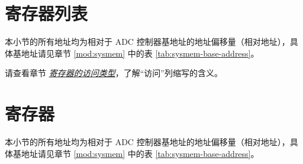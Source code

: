 \documentclass[main\_\_CN.tex]{subfiles}
\begin{document}
\section{寄存器列表}



本小节的所有地址均为相对于 ADC 控制器基地址的地址偏移量（相对地址），具体基地址请见章节 \ref{mod:sysmem} \textit{} 中的表 \ref{tab:sysmem-base-address}。

请查看章节 \hyperref[glossary-access-types]{\textit{寄存器的访问类型}}，了解“访问”列缩写的含义。



\section{寄存器}

本小节的所有地址均为相对于 ADC 控制器基地址的地址偏移量（相对地址），具体基地址请见章节 \ref{mod:sysmem} \textit{} 中的表 \ref{tab:sysmem-base-address}。


\end{document}
